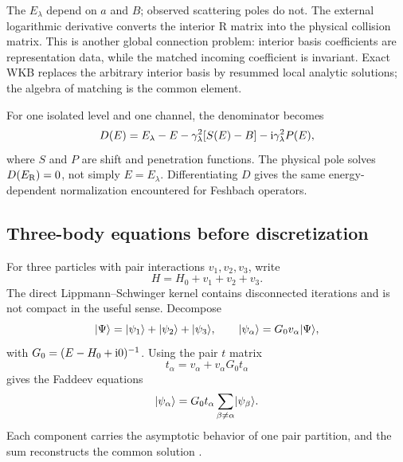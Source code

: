 The $E_\lambda$ depend on $a$ and $B$; observed scattering poles do not.  The
external logarithmic derivative converts the interior R matrix into the
physical collision matrix.  This is another global connection problem:
interior basis coefficients are representation data, while the matched
incoming coefficient is invariant.  Exact WKB replaces the arbitrary
interior basis by resummed local analytic solutions; the algebra of matching
is the common element.

For one isolated level and one channel, the denominator becomes
\begin{equation}
  D(E)=E_\lambda-E-\gamma_\lambda^2[S(E)-B]
       -\mathrm{i}\gamma_\lambda^2P(E),
  \label{eq:r-matrix-level-denominator}
\end{equation}
where $S$ and $P$ are shift and penetration functions.  The physical pole
solves $D(E_{\mathrm{R}})=0$, not simply $E=E_\lambda$.  Differentiating $D$ gives the
same energy-dependent normalization encountered for Feshbach operators.

\subsection{Three-body equations before discretization}
\label{subsec:faddeev-foundations}

For three particles with pair interactions $v_1,v_2,v_3$, write
\begin{equation}
  H=H_0+v_1+v_2+v_3.
  \label{eq:three-body-H-faddeev}
\end{equation}
The direct Lippmann--Schwinger kernel contains disconnected iterations and is
not compact in the useful sense.  Decompose
\begin{equation}
  \lvert \Psi \rangle=\lvert \psi_1 \rangle+\lvert \psi_2 \rangle+\lvert \psi_3 \rangle,
  \qquad
  \lvert \psi_\alpha \rangle=G_0v_\alpha\lvert \Psi \rangle,
  \label{eq:faddeev-components}
\end{equation}
with $G_0=(E-H_0+\mathrm{i}0)^{-1}$.  Using the pair $t$ matrix
\begin{equation}
  t_\alpha=v_\alpha+v_\alpha G_0t_\alpha
  \label{eq:pair-t-matrix}
\end{equation}
gives the Faddeev equations
\begin{equation}
  \lvert \psi_\alpha \rangle
  =G_0t_\alpha
  \sum_{\beta\neq\alpha}\lvert \psi_\beta \rangle.
  \label{eq:faddeev-equations}
\end{equation}
Each component carries the asymptotic behavior of one pair partition, and the
sum reconstructs the common solution \cite{Faddeev1961,FaddeevMerkuriev:1993}.

